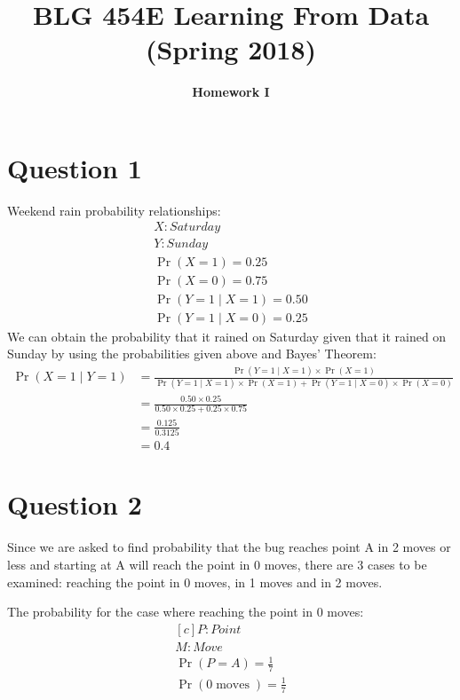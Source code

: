 \documentclass{article}
\DeclareMathOperator{\CondProb}{Pr}
\DeclareMathOperator{\moves}{moves}
\begin{document}
\title{\bf BLG 454E Learning From Data (Spring 2018)}
\author{\bf Homework I}
\date{}
\maketitle


\section{Question 1}
Weekend rain probability relationships:
\begin{equation*}
\begin{aligned}
	X : Saturday \\
	Y : Sunday \\
	\CondProb{(X = 1)} = 0.25 \\
	\CondProb{(X = 0)} = 0.75 \\
	\CondProb{(Y = 1 \mid X = 1)} = 0.50 \\
	\CondProb{(Y = 1 \mid X = 0)} = 0.25 
\end{aligned}
\end{equation*}
	We can obtain the probability that it rained on Saturday given that it rained on Sunday by using the probabilities given above and Bayes' Theorem:
\begin{equation*}
\begin{split}
	\CondProb{(X = 1 \mid Y = 1)} &=\frac{\CondProb{(Y = 1 \mid X = 1)}\times \CondProb{(X = 1)}}{\CondProb{(Y = 1 \mid X = 1)}\times \CondProb{(X = 1)} + \CondProb{(Y = 1 \mid X = 0)}\times \CondProb{(X = 0)}} \\
	&= \frac{0.50\times 0.25}{0.50\times 0.25 + 0.25\times 0.75} \\
	&= \frac{0.125}{0.3125} \\
	&= \boxed{0.4}
\end{split}
\end{equation*}
\section{Question 2}
Since we are asked to find probability that the bug reaches point A in 2 moves or less and starting at A will reach the point in 0 moves, there are 3 cases to be examined: reaching the point in 0 moves, in 1 moves and in 2 moves.

The probability for the case where reaching the point in 0 moves:  
\begin{equation*}
	\begin{aligned}[c]
	P: Point \\
	M: Move \\
	\CondProb{(P = A)} = \frac{1}{7} \\
	\CondProb{(0 \moves)} = \frac{1}{7}
	\end{aligned}
\end{equation*}
 
\end{document}
